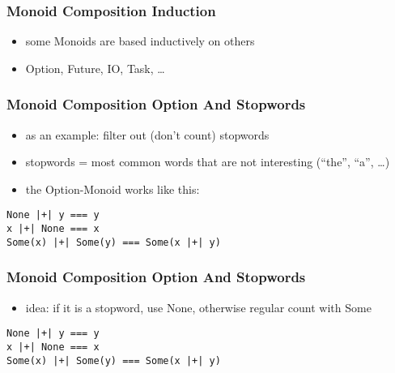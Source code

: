 \documentclass[aspectratio=169]{beamer}
\begin{document}
\begin{frame}
  \frametitle{Monoid Composition \textemdash{} Induction}
  \begin{itemize}
  \item some Monoids are based inductively on others
  \item Option, Future, IO, Task, \ldots{}
  \end{itemize}
\end{frame}

\begin{frame}[fragile]
  \frametitle{Monoid Composition \textemdash{} Option And Stopwords}
  \begin{itemize}
  \item as an example: filter out (don't count) stopwords
  \item stopwords = most common words that are not interesting (``the'', ``a'', \ldots{})
  \item the Option-Monoid works like this:
  \end{itemize}
  \begin{center}
  \begin{verbatim}
None |+| y === y
x |+| None === x
Some(x) |+| Some(y) === Some(x |+| y)
  \end{verbatim}
\end{center}
\end{frame}

\begin{frame}[fragile]
  \frametitle{Monoid Composition \textemdash{} Option And Stopwords}
  \begin{itemize}
  \item idea: if it is a stopword, use None, otherwise regular count with Some
  \end{itemize}
  \begin{center}
  \begin{verbatim}
None |+| y === y
x |+| None === x
Some(x) |+| Some(y) === Some(x |+| y)
  \end{verbatim}
\end{center}
\end{frame}
\end{document}
